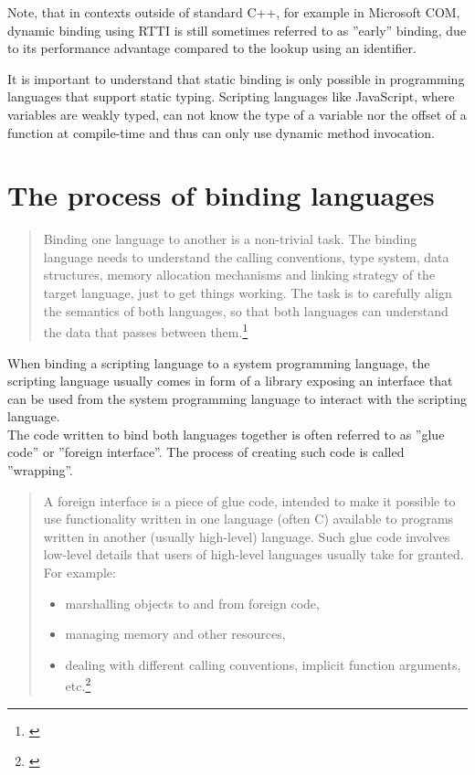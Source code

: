Note, that in contexts outside of standard C++, for example in Microsoft COM, dynamic binding using RTTI is still sometimes referred to as ''early'' binding, due to its performance advantage compared to the lookup using an identifier.

It is important to understand that static binding is only possible in programming languages that support static typing. Scripting languages like JavaScript, where variables are weakly typed, can not know the type of a variable nor the offset of a function at compile-time and thus can only use dynamic method invocation.

\section{The process of binding languages}

\begin{quotation}
Binding one language to another is a non-trivial task. The binding language needs to understand the calling conventions, type system, data structures, memory allocation mechanisms and linking strategy of the target language, just to get things working. The task is to carefully align the semantics of both languages, so that both languages can understand the data that passes between them.\footnote{\citep{RealWorldHaskell}}
\end{quotation}

When binding a scripting language to a system programming language, the scripting language usually comes in form of a library exposing an interface that can be used from the system programming language to interact with the scripting language.\\
The code written to bind both languages together is often referred to as ''glue code'' or ''foreign interface''. The process of creating such code is called ''wrapping''.

\begin{quotation}
A foreign interface is a piece of glue code, intended to make it possible to use functionality written in one language (often C) available to programs written in another (usually high-level) language. Such glue code involves low-level details that users of high-level languages usually take for granted. For example:
\begin{itemize}
\item marshalling objects to and from foreign code,
\item managing memory and other resources,
\item dealing with different calling conventions, implicit function arguments, etc.\footnote{\citep{FFIScheme}}
\end{itemize}
\end{quotation}

